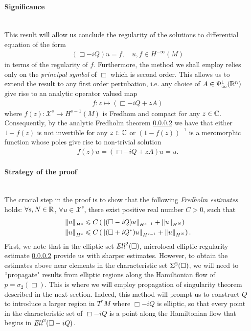 \documentclass[12pt]{article}
\begin{document}
\paragraph{Significance} \hfill \\
This result will allow us conclude the regularity of the solutions to differential equation of the form 
\begin{align*}
(\Box - iQ) u = f, \quad u, f \in H^{-\infty}(M)
\end{align*}
in terms of the regularity of $f$. Furthermore, the method we shall employ relies only on the \emph{principal symbol} of $\Box$ which is second order. This allows us to extend the result to any first order pertubation, i.e. any choice of $A \in \Psi^{1}_{\infty}(\R^n)$ give rise to an analytic operator valued map 
\begin{align*}
f : z \mapsto (\Box - iQ + zA)
\end{align*}
where $f(z) : \mathcal{X}^s \to H^{s - 1}(M)$ is Fredhom and compact for any $z \in \C$. Consequently, by the analytic Fredholm theorem \ref{}  we have that either $1 - f(z)$ is not invertible for any $z \in \C$ or $(1 - f(z))^{-1}$ is a meromorphic function whose poles give rise to non-trivial solution 
\begin{align*}
f(z) u = (\Box - iQ + zA) u = u. 
\end{align*}

\paragraph{Strategy of the proof} \hfill \\
The crucial step in the proof is to show that the following \textit{Fredholm estimates} holds: $\forall s, N \in \R$, $\forall u \in \mathcal{X}^s$, there exist positive real number $C > 0$, such that
\begin{align*}
&\norm[u]_{H^s} \leq C \brac{ \norm[(\Box - i Q)u]_{H^{s - 1}} + \norm[u]_{H^N}} \\
&\norm[u]_{H^s} \leq C \brac{ \norm[(\Box + i Q^*)u]_{H^{s - 1}} + \norm[u]_{H^N}}. 
\end{align*}
First, we note that in the elliptic set $\Ell^2(\Box)$, microlocal elliptic regularity estimate \ref{} provide us with sharper estimates. However, to obtain the estimates above near elements in the characteristic set $\Char^2(\Box)$, we will need to ``propagate" results from elliptic regions along the Hamiltonian flow of $p = \sigma_2(\Box)$. This is where we will employ propagation of singularity theorem described in the next section. Indeed, this method will prompt us to construct $Q$ to introduce a larger region in $T^*M$ where $\Box - iQ$ is elliptic, so that every point in the characteristic set of $\Box - iQ$ is a point along the Hamiltonian flow that begins in $\Ell^2(\Box - iQ)$. 
\end{document}

